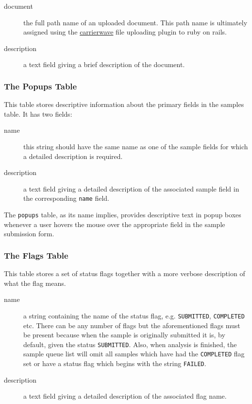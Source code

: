 \documentclass[12pt]{article}
\begin{document}
\begin{description}
\item[document]
the full path name of an uploaded document. This path name is ultimately
assigned using the 
\href{https://github.com/jnicklas/carrierwave}{carrierwave}
file uploading plugin to ruby on rails.
\item[description]
a text field giving a brief description of the document.
\end{description}

\subsubsection{The Popups Table}
This table stores descriptive information about the primary fields
in the samples table. It has two fields:

\begin{description}
\item[name]
this string should have the same name as one of the sample fields for
which a detailed description is required.
\item[description]
a text field giving a detailed description of the associated sample field
in the corresponding \verb=name= field.
\end{description}

The \verb=popups= table, as its name implies, provides descriptive
text in popup boxes whenever a user hovers the mouse over the
appropriate field in the sample submission form.

\subsubsection{The Flags Table}
This table stores a set of status flags together with a more verbose
description of what the flag means. 

\begin{description}
\item[name]
a string containing the name of the status flag, e.g. 
\verb=SUBMITTED=, \verb=COMPLETED= etc. There can be any number of flags
but the aforementioned flags must be present because when the sample is
originally submitted it is, by default, given the status
\verb=SUBMITTED=. Also, when analysis is finished, the sample queue list
will omit all samples which have had the \verb=COMPLETED= flag set
or have a status flag which begins with the string \verb=FAILED=.
\item[description]
a text field giving a detailed description of the associated flag name.
\end{description}
\end{document}
